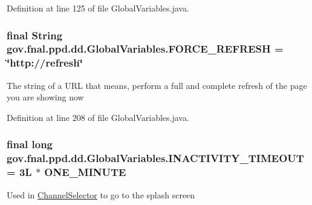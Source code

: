 Definition at line 125 of file Global\-Variables.\-java.

\hypertarget{classgov_1_1fnal_1_1ppd_1_1dd_1_1GlobalVariables_a79c44481889ff937b51e30d13d9c1c35}{
\subsubsection[{F\-O\-R\-C\-E\-\_\-\-R\-E\-F\-R\-E\-S\-H}]{\setlength{\rightskip}{0pt plus 5cm}final String gov.\-fnal.\-ppd.\-dd.\-Global\-Variables.\-F\-O\-R\-C\-E\-\_\-\-R\-E\-F\-R\-E\-S\-H = \char`\"{}http\-://refresh\char`\"{}\hspace{0.3cm}{\ttfamily [static]}}}\label{classgov_1_1fnal_1_1ppd_1_1dd_1_1GlobalVariables_a79c44481889ff937b51e30d13d9c1c35}
The string of a U\-R\-L that means, perform a full and complete refresh of the page you are showing now 

Definition at line 208 of file Global\-Variables.\-java.

\hypertarget{classgov_1_1fnal_1_1ppd_1_1dd_1_1GlobalVariables_ab33d116e6a83d46d778ee5c3521a39a4}{
\subsubsection[{I\-N\-A\-C\-T\-I\-V\-I\-T\-Y\-\_\-\-T\-I\-M\-E\-O\-U\-T}]{\setlength{\rightskip}{0pt plus 5cm}final long gov.\-fnal.\-ppd.\-dd.\-Global\-Variables.\-I\-N\-A\-C\-T\-I\-V\-I\-T\-Y\-\_\-\-T\-I\-M\-E\-O\-U\-T = 3\-L $\ast$ O\-N\-E\-\_\-\-M\-I\-N\-U\-T\-E\hspace{0.3cm}{\ttfamily [static]}}}\label{classgov_1_1fnal_1_1ppd_1_1dd_1_1GlobalVariables_ab33d116e6a83d46d778ee5c3521a39a4}
Used in \hyperlink{classgov_1_1fnal_1_1ppd_1_1dd_1_1ChannelSelector}{Channel\-Selector} to go to the splash screen 

